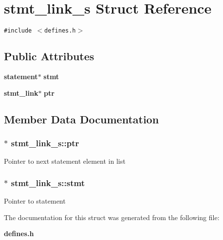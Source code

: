 \section{stmt\_\-link\_\-s  Struct Reference}
\label{structstmt__link__s}
{\tt \#include $<$defines.h$>$}

\subsection*{Public Attributes}
\begin{CompactItemize}
\item 
{\bf statement}$\ast$ {\bf stmt}
\item 
{\bf stmt\_\-link}$\ast$ {\bf ptr}
\end{CompactItemize}


\subsection{Member Data Documentation}
\subsubsection{ $\ast$ stmt\_\-link\_\-s::ptr}\label{structstmt__link__s_m1}


Pointer to next statement element in list 
\subsubsection{ $\ast$ stmt\_\-link\_\-s::stmt}\label{structstmt__link__s_m0}


Pointer to statement 

The documentation for this struct was generated from the following file:\begin{CompactItemize}
\item 
{\bf defines.h}\end{CompactItemize}
